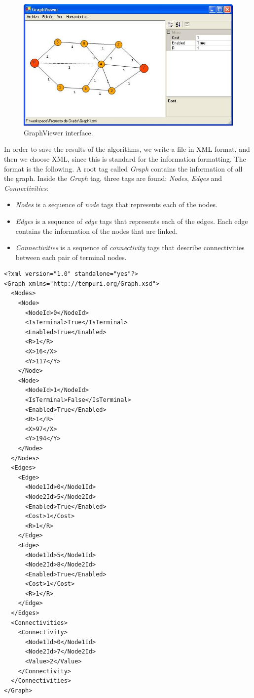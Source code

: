 \begin{figure}[H]
\begin{center}
\includegraphics[scale=0.75]{5.jpg}
\caption{GraphViewer interface.}\label{App-1}
\end{center} 
\end{figure}

In order to save the results of the algorithms, we write a file in XML format, and then we choose XML, 
since this is standard for the information formatting. The format is the following. A root tag called \emph{Graph} contains the information of all the graph. Inside the \emph{Graph} tag, three tags are found: \emph{Nodes}, \emph{Edges} and \emph{Connectivities}:
\begin{itemize}
\item \emph{Nodes} is a sequence of \emph{node} tags that represents each of the nodes.
\item \emph{Edges} is a sequence of \emph{edge} tags that represents each of the edges. Each edge contains the information of the nodes that are linked.
\item \emph{Connectivities} is a sequence of \emph{connectivity} tags that describe connectivities between 
each pair of terminal nodes. 
\end{itemize}


\begin{verbatim}
<?xml version="1.0" standalone="yes"?>
<Graph xmlns="http://tempuri.org/Graph.xsd">
  <Nodes>
    <Node>
      <NodeId>0</NodeId>
      <IsTerminal>True</IsTerminal>
      <Enabled>True</Enabled>
      <R>1</R>
      <X>16</X>
      <Y>117</Y>
    </Node>
    <Node>
      <NodeId>1</NodeId>
      <IsTerminal>False</IsTerminal>
      <Enabled>True</Enabled>
      <R>1</R>
      <X>97</X>
      <Y>194</Y>
    </Node>
  </Nodes>
  <Edges>
    <Edge>
      <Node1Id>0</Node1Id>
      <Node2Id>5</Node2Id>
      <Enabled>True</Enabled>
      <Cost>1</Cost>
      <R>1</R>
    </Edge>
    <Edge>
      <Node1Id>5</Node1Id>
      <Node2Id>8</Node2Id>
      <Enabled>True</Enabled>
      <Cost>1</Cost>
      <R>1</R>
    </Edge>
  </Edges>
  <Connectivities>
    <Connectivity>
      <Node1Id>0</Node1Id>
      <Node2Id>7</Node2Id>
      <Value>2</Value>
    </Connectivity>
  </Connectivities>
</Graph>
\end{verbatim}

